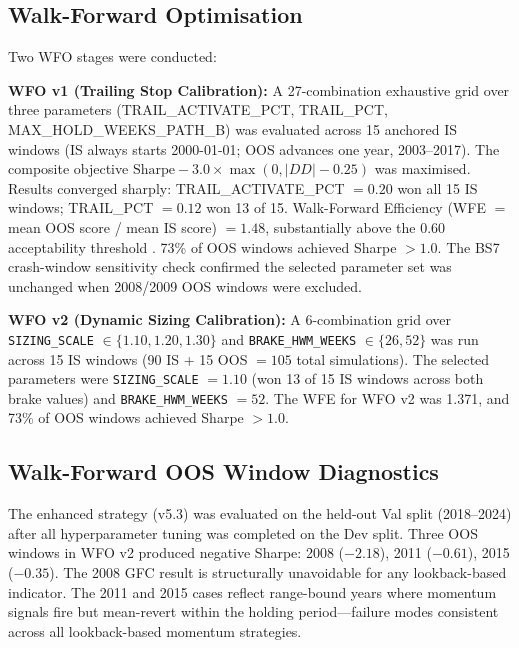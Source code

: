 \documentclass[11pt,twoside,a4paper]{article}
\begin{document}
\subsection{Walk-Forward Optimisation}

Two WFO stages were conducted:

\textbf{WFO v1 (Trailing Stop Calibration):} A 27-combination exhaustive grid over three parameters (TRAIL\_ACTIVATE\_PCT, TRAIL\_PCT, MAX\_HOLD\_WEEKS\_PATH\_B) was evaluated across 15 anchored IS windows (IS always starts 2000-01-01; OOS advances one year, 2003--2017). The composite objective $\text{Sharpe} - 3.0 \times \max(0, |DD| - 0.25)$ was maximised. Results converged sharply: TRAIL\_ACTIVATE\_PCT $= 0.20$ won all 15 IS windows; TRAIL\_PCT $= 0.12$ won 13 of 15. Walk-Forward Efficiency (WFE $=$ mean OOS score / mean IS score) $= 1.48$, substantially above the 0.60 acceptability threshold \citep{Pardo2008}. 73\% of OOS windows achieved Sharpe $> 1.0$. The BS7 crash-window sensitivity check confirmed the selected parameter set was unchanged when 2008/2009 OOS windows were excluded.

\textbf{WFO v2 (Dynamic Sizing Calibration):} A 6-combination grid over \texttt{SIZING\_SCALE} $\in \{1.10, 1.20, 1.30\}$ and \texttt{BRAKE\_HWM\_WEEKS} $\in \{26, 52\}$ was run across 15 IS windows (90 IS + 15 OOS $= 105$ total simulations). The selected parameters were \texttt{SIZING\_SCALE} $= 1.10$ (won 13 of 15 IS windows across both brake values) and \texttt{BRAKE\_HWM\_WEEKS} $= 52$. The WFE for WFO v2 was 1.371, and 73\% of OOS windows achieved Sharpe $> 1.0$.

\subsection{Walk-Forward OOS Window Diagnostics}

The enhanced strategy (v5.3) was evaluated on the held-out Val split (2018--2024) after all hyperparameter tuning was completed on the Dev split. Three OOS windows in WFO v2 produced negative Sharpe: 2008 ($-2.18$), 2011 ($-0.61$), 2015 ($-0.35$). The 2008 GFC result is structurally unavoidable for any lookback-based indicator. The 2011 and 2015 cases reflect range-bound years where momentum signals fire but mean-revert within the holding period---failure modes consistent across all lookback-based momentum strategies.
\end{document}
